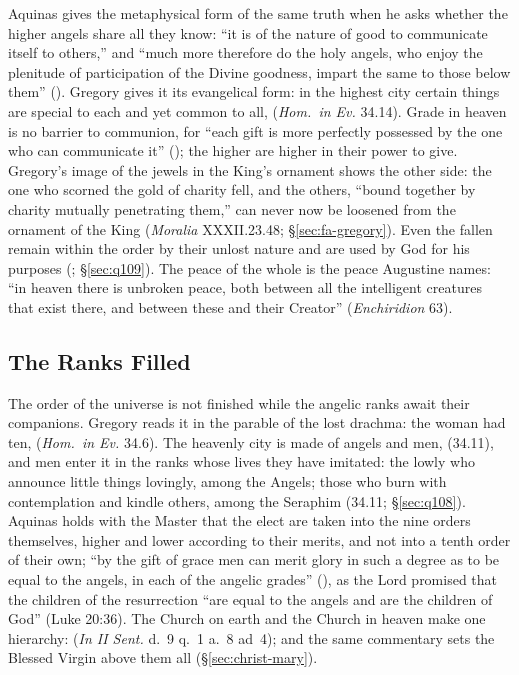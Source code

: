 Aquinas gives the metaphysical form of the same truth when he asks whether
the higher angels share all they know: ``it is of the nature of good to
communicate itself to others,'' and ``much more therefore do the holy angels,
who enjoy the plenitude of participation of the Divine goodness, impart the
same to those below them'' (). Gregory gives it its
evangelical form: in the highest city certain things are special to each and
yet common to all,  (\emph{Hom.\ in Ev.} 34.14). Grade in heaven is no barrier to
communion, for ``each gift is more perfectly possessed by the one who can
communicate it'' (); the higher are higher in their
power to give. Gregory's image of the jewels in the King's ornament shows
the other side: the one who scorned the gold of charity fell, and the
others, ``bound together by charity mutually penetrating them,'' can never
now be loosened from the ornament of the King (\emph{Moralia} XXXII.23.48;
\S\ref{sec:fa-gregory}). Even the fallen remain within the order by their unlost
nature and are used by God for his purposes (;
\S\ref{sec:q109}). The peace of the whole is the peace Augustine names: ``in
heaven there is unbroken peace, both between all the intelligent creatures
that exist there, and between these and their Creator'' (\emph{Enchiridion}
63).

\subsection{The Ranks Filled}

The order of the universe is not finished while the angelic ranks await
their companions. Gregory reads it in the parable of the lost drachma: the
woman had ten,  (\emph{Hom.\ in Ev.} 34.6).
The heavenly city is made of angels and men, 
(34.11), and men enter it in the ranks whose lives they have imitated: the
lowly who announce little things lovingly, among the Angels; those who burn
with contemplation and kindle others, among the Seraphim (34.11;
\S\ref{sec:q108}). Aquinas holds with the Master that the elect are taken
into the nine orders themselves, higher and lower according to their merits,
and not into a tenth order of their own; ``by the gift of grace men can merit
glory in such a degree as to be equal to the angels, in each of the angelic
grades'' (), as the Lord promised that the children of the
resurrection ``are equal to the angels and are the children of God'' (Luke
20:36). The Church on earth and the Church in heaven make one hierarchy:
 (\emph{In II Sent.}
d.~9 q.~1 a.~8 ad~4); and the same commentary sets the Blessed Virgin above
them all (\S\ref{sec:christ-mary}).

